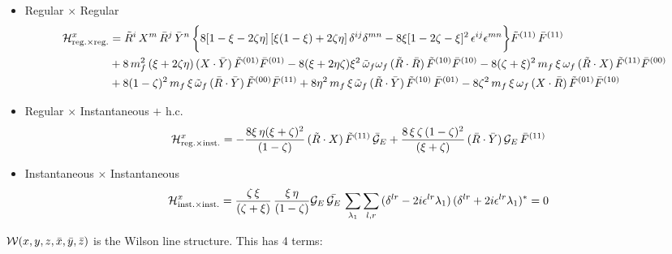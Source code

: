 \documentclass[9pt]{article}
\numberwithin{equation}{section}
\begin{document}
\begin{itemize}
    \item Regular $\times$ Regular
    \begin{align}
    \mathcal{H}^{x}_{\mathrm{reg.}\times \mathrm{reg.}} & = \Tilde{R}^{i}\,X^{m}\,\Bar{R}^{j}\,\Bar{Y}^{n}\,\bigg\{8[1-\xi-2\zeta\eta]\,[\xi(1-\xi) + 2\zeta\eta]\,\delta^{ij}\delta^{mn}-8\xi[1-2\zeta-\xi]^{2}\,\epsilon^{ij}\epsilon^{mn}\bigg\}\Tilde{F}^{(11)}\,\Bar{F}^{(11)}\notag \\ & +8\,m^{2}_{f}\,(\xi +2\zeta\eta)\, (X\cdot \Bar{Y})\,\Tilde{F}^{(01)}\Bar{F}^{(01)} - 8(\xi + 2\eta\zeta)\xi^{2}\,\Tilde{\omega}_{f}\omega_{f}\,(\Tilde{R}\cdot\Bar{R})\,\Tilde{F}^{(10)}\Bar{F}^{(10)} - 8(\zeta + \xi)^{2}\,m_{f}\,\xi\,\omega_{f}\,(\Tilde{R}\cdot X)\,\Tilde{F}^{(11)}\Bar{F}^{(00)}\notag \\ & + 8(1-\zeta)^{2}\,m_{f}\,\xi\,\Tilde{\omega}_{f}\,(\Bar{R}\cdot \Bar{Y})\,\Tilde{F}^{(00)}\Bar{F}^{(11)} +8\eta^{2}\,m_{f}\,\xi\, \Tilde{\omega}_{f}\,(\Tilde{R}\cdot \Bar{Y})\,\Tilde{F}^{(10)}\,\Bar{F}^{(01)}-8\zeta^{2}\,m_{f}\,\xi\,\omega_{f}\,(X\cdot \Bar{R})\,\Tilde{F}^{(01)}\Bar{F}^{(10)}
    \end{align}
    \item Regular $\times$ Instantaneous $+$ h.c.
    \begin{align}
    \mathcal{H}^{x}_{\mathrm{reg.}\times \mathrm{inst.}} & = -\frac{8\xi\,\eta (\xi +\zeta)^{2}}{(1-\zeta)}\,(\Tilde{R}\cdot X)\,\Tilde{F}^{(11)}\,\Bar{\mathcal{G}}_{E} + \frac{8\,\xi\,\zeta\,(1-\zeta)^{2}}{(\xi + \zeta)}\,(\Bar{R}\cdot \Bar{Y})\,\mathcal{G}_{E}\,\Bar{F}^{(11)}
    \end{align}
\item Instantaneous $\times$ Instantaneous
    \begin{align}
    \mathcal{H}^{x}_{\mathrm{inst.}\times \mathrm{inst.}} & = \frac{\zeta\,\xi}{(\zeta + \xi)}\,\frac{\xi\,\eta}{(1-\zeta)}\mathcal{G}_{E}\,\Bar{\mathcal{G}_{E}}\,\sum_{\lambda_{1}}\sum_{l,r}\,(\delta^{lr}-2i\epsilon^{lr}\lambda_{1})\,(\delta^{lr}+2i\epsilon^{lr}\lambda_{1})^{*} = 0
    \end{align}
\end{itemize}
$\mathcal{W}(x,y,z,\Bar{x},\Bar{y},\Bar{z})$ is the Wilson line structure. This has 4 terms:
\end{document}
